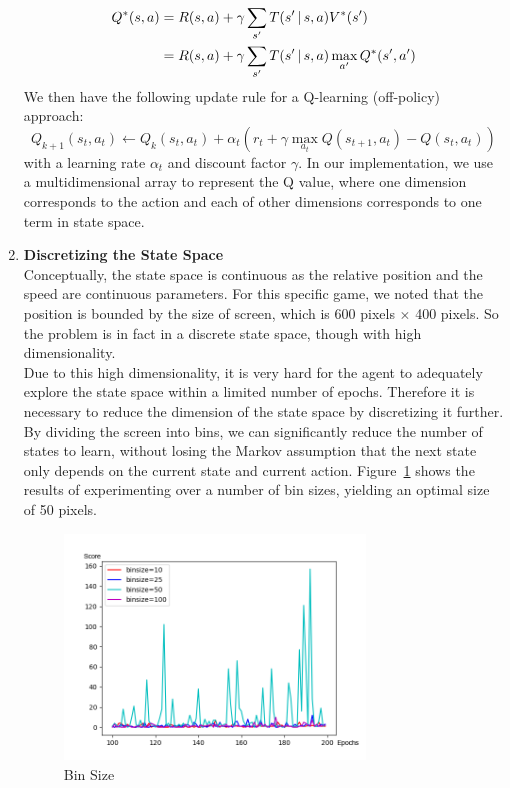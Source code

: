 \documentclass[11pt]{article}
\begin{document}
\begin{enumerate}
          \begin{align*}
          Q^*(s, a) &= R(s, a) + \gamma \sum_{s'} T(s' \,|\, s, a) V^*(s')\\
          &= R(s, a) + \gamma \sum_{s'} T(s' \,|\, s, a) \max_{a'} Q^*(s', a')
          \end{align*}
          We then have the following update rule for a Q-learning (off-policy) approach:
          \[Q_{k+1}(s_t, a_t) \leftarrow Q_k(s_t, a_t) + \alpha_t(r_t + \gamma \max_{a_t} Q(s_{t+1}, a_t) - Q(s_t, a_t))\]
          with a learning rate $\alpha_t$ and discount factor $\gamma$. In our implementation, we use a multidimensional array to represent the Q value, where one dimension corresponds to the action and each of other dimensions corresponds to one term in state space.
  
        \item \textbf{Discretizing the State Space}\\
        Conceptually, the state space is continuous as the relative position and the speed are continuous parameters. For this specific game, we noted that the position is bounded by the size of screen, which is 600 pixels $\times$ 400 pixels. So the problem is in fact in a discrete state space, though with high dimensionality.\\ 
        Due to this high dimensionality, it is very hard for the agent to adequately explore the state space within a limited number of epochs. Therefore it is necessary to reduce the dimension of the state space by discretizing it further. By dividing the screen into bins, we can significantly reduce the number of states to learn, without losing the Markov assumption that the next state only depends on the current state and current action. Figure~\ref{fig:binsize} shows the results of experimenting over a number of bin sizes, yielding an optimal size of 50 pixels.

          \begin{figure}[H]
            \centering
            \includegraphics[width=8cm]{binsize.png}
            \caption{Bin Size}
            \label{fig:binsize}
          \end{figure}
          

\end{enumerate}
\end{document}
